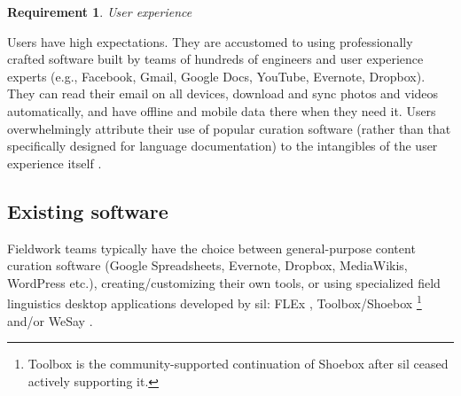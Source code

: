 \documentclass[11pt]{article}
\newcommand{\smalltodo}[2][]
    {\todo[caption={#2}, #1]
    {\tiny#2\normalsize}}
\newtheorem{requirement}{Requirement}
\begin{document}



\begin{requirement}
	\label{req:experience}
       User experience
\end{requirement}


Users have high expectations. They are accustomed to using professionally
crafted software built by teams of hundreds of engineers and user experience
experts (e.g., Facebook, Gmail, Google Docs, YouTube, Evernote, Dropbox). They
can read their email on all devices, download and sync photos and videos
automatically, and have offline and mobile data there when they need it.
Users overwhelmingly attribute their use of popular curation
software (rather than that specifically designed for language documentation) to
the intangibles of the user experience itself \cite{lingsync:2012}.




\subsection{Existing software}
\label{sec:existing-software}

Fieldwork teams typically have the choice between general-purpose content
curation software (Google Spreadsheets, Evernote, Dropbox, MediaWikis,
WordPress etc.), creating/customizing their own tools, or using specialized
field linguistics desktop applications developed by \gls{sil}:  FLEx
\cite{sil-flex}, Toolbox/Shoebox%
\footnote{Toolbox is the community-supported continuation of Shoebox after
    \gls{sil} ceased actively supporting it.} %
\cite{sil-toolbox-info} and/or WeSay \cite{WeSay:2007:Online}.
\end{document}

